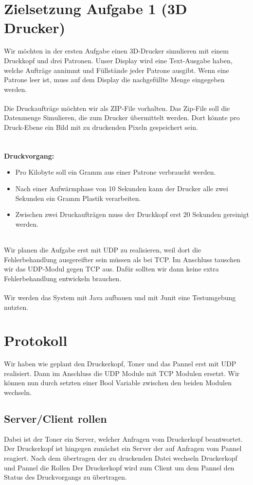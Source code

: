 \documentclass[10pt]{article}
\begin{document}
\section{Zielsetzung Aufgabe 1 (3D Drucker)}
Wir möchten in der ersten Aufgabe einen 3D-Drucker simulieren mit einem Druckkopf und drei Patronen.
Unser Display wird eine Text-Ausgabe haben, welche Aufträge annimmt und Füllstände jeder Patrone ausgibt.
Wenn eine Patrone leer ist, muss auf dem Display die nachgefüllte Menge eingegeben werden.
\\
\\
Die Druckaufträge möchten wir als ZIP-File vorhalten. Das Zip-File soll die Datenmenge Simulieren, die zum Drucker übermittelt werden. Dort könnte pro Druck-Ebene ein Bild mit zu druckenden Pixeln gespeichert sein.\\
\\
\\
\textbf{Druckvorgang:}
\begin{itemize}
\item Pro Kilobyte soll ein Gramm aus einer Patrone verbraucht werden.
\item Nach einer Aufwärmphase von 10 Sekunden kann der Drucker alle zwei Sekunden ein Gramm Plastik verarbeiten.
\item Zwischen zwei Druckaufträgen muss der Druckkopf erst 20 Sekunden gereinigt werden.
\end{itemize}
\\
Wir planen die Aufgabe erst mit UDP zu realisieren, weil dort die Fehlerbehandlung ausgereifter sein müssen als bei TCP.
Im Anschluss tauschen wir das UDP-Modul gegen TCP aus. Dafür sollten wir dann keine extra Fehlerbehandlung entwickeln brauchen.
\\
\\
Wir werden das System mit Java aufbauen und mit Junit eine Testumgebung nutzten.

\section{Protokoll}
Wir haben wie geplant den Druckerkopf, Toner und das Pannel erst mit UDP realisiert. 
Dann im Anschluss die UDP Module mit TCP Modulen ersetzt.
Wir können nun durch setzten einer Bool Variable zwischen den beiden Modulen wechseln. 

\subsection{Server/Client rollen}
Dabei ist der Toner ein Server, welcher Anfragen vom Druckerkopf beantwortet. Der Druckerkopf ist hingegen zunächst ein Server der auf Anfragen vom Pannel reagiert. Nach dem übertragen der zu druckenden Datei wechseln Druckerkopf und Pannel die Rollen Der Druckerkopf wird zum Client um dem Pannel den Status des Druckvorgangs zu übertragen.
\end{document}
